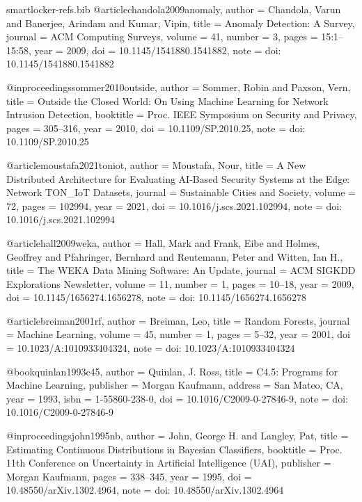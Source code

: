\begin{filecontents*}[overwrite]{smartlocker-refs.bib}
@article{chandola2009anomaly,
  author  = {Chandola, Varun and Banerjee, Arindam and Kumar, Vipin},
  title   = {Anomaly Detection: A Survey},
  journal = {ACM Computing Surveys},
  volume  = {41},
  number  = {3},
  pages   = {15:1--15:58},
  year    = {2009},
  doi     = {10.1145/1541880.1541882},
  note    = {doi: 10.1145/1541880.1541882}
}

@inproceedings{sommer2010outside,
  author    = {Sommer, Robin and Paxson, Vern},
  title     = {Outside the Closed World: On Using Machine Learning for Network Intrusion Detection},
  booktitle = {Proc. IEEE Symposium on Security and Privacy},
  pages     = {305--316},
  year      = {2010},
  doi       = {10.1109/SP.2010.25},
  note      = {doi: 10.1109/SP.2010.25}
}

@article{moustafa2021toniot,
  author  = {Moustafa, Nour},
  title   = {A New Distributed Architecture for Evaluating {AI}-Based Security Systems at the Edge: Network {TON\_IoT} Datasets},
  journal = {Sustainable Cities and Society},
  volume  = {72},
  pages   = {102994},
  year    = {2021},
  doi     = {10.1016/j.scs.2021.102994},
  note    = {doi: 10.1016/j.scs.2021.102994}
}

@article{hall2009weka,
  author  = {Hall, Mark and Frank, Eibe and Holmes, Geoffrey and Pfahringer, Bernhard and Reutemann, Peter and Witten, Ian H.},
  title   = {The {WEKA} Data Mining Software: An Update},
  journal = {ACM SIGKDD Explorations Newsletter},
  volume  = {11},
  number  = {1},
  pages   = {10--18},
  year    = {2009},
  doi     = {10.1145/1656274.1656278},
  note    = {doi: 10.1145/1656274.1656278}
}

@article{breiman2001rf,
  author  = {Breiman, Leo},
  title   = {Random Forests},
  journal = {Machine Learning},
  volume  = {45},
  number  = {1},
  pages   = {5--32},
  year    = {2001},
  doi     = {10.1023/A:1010933404324},
  note    = {doi: 10.1023/A:1010933404324}
}

@book{quinlan1993c45,
  author    = {Quinlan, J. Ross},
  title     = {C4.5: Programs for Machine Learning},
  publisher = {Morgan Kaufmann},
  address   = {San Mateo, CA},
  year      = {1993},
  isbn      = {1-55860-238-0},
  doi       = {10.1016/C2009-0-27846-9},
  note      = {doi: 10.1016/C2009-0-27846-9}
}

@inproceedings{john1995nb,
  author    = {John, George H. and Langley, Pat},
  title     = {Estimating Continuous Distributions in {Bayesian} Classifiers},
  booktitle = {Proc. 11th Conference on Uncertainty in Artificial Intelligence (UAI)},
  publisher = {Morgan Kaufmann},
  pages     = {338--345},
  year      = {1995},
  doi       = {10.48550/arXiv.1302.4964},
  note      = {doi: 10.48550/arXiv.1302.4964}
}


\end{filecontents*}
